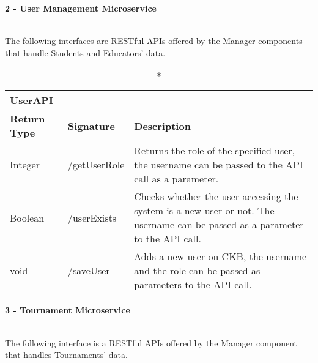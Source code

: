 \begin{large}{\textbf{2 - User Management Microservice}}\end{large}\\
The following interfaces are RESTful APIs offered by the Manager components that handle Students and Educators' data.

\begin{longtable}{|p{2.5cm} p{6.5cm} p{4.5cm}|}
	\caption*{UserAPI}\\ 
	
	\hline
	\textbf{Return Type} & \textbf{Signature} & \textbf{Description}\\
	\hline \endhead
	
	Integer & /getUserRole & Returns the role of the specified user, the username can be passed to the API call as a parameter.\\
	
	Boolean & /userExists & Checks whether the user accessing the system is a new user or not. The username can be passed as a parameter to the API call. \\
	
	void & /saveUser & Adds a new user on CKB, the username and the role can be passed as parameters to the API call.\\
	\hline
	
\end{longtable}


\pagebreak

	\begin{large}{\textbf{3 - Tournament Microservice}}\end{large}\\
	The following interface is a RESTful APIs offered by the Manager component that handles Tournaments' data.
	
